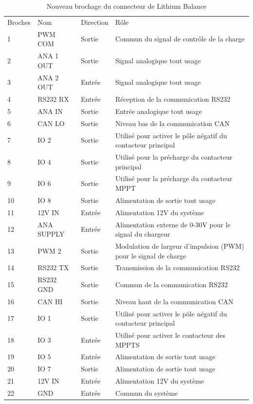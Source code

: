 		\begin{table}[H]
			\centering
			\caption{Nouveau brochage du connecteur de Lithium Balance}
			\label{22CBmsEclipse}	
			\renewcommand{\arraystretch}{1.3}
			\begin{tabular}{ | l | l | l | l | }
				\hline
				Broches & Nom & Direction & Rôle \\ \hhline{|=|=|=|=|}
				1 & PWM COM & Sortie & Commun du signal de contrôle de la charge \\ \hline
				2 & ANA 1 OUT & Sortie & Signal analogique tout usage \\ \hline
				3 & ANA 2 OUT & Entrée & Signal analogique tout usage \\ \hline
				4 & RS232 RX & Entrée & Réception de la communication RS232 \\ \hline
				5 & ANA IN & Sortie & Entrée analogique tout usage \\ \hline
				6 & CAN LO & Sortie & Niveau bas de la communication CAN \\ \hline
				7 & IO 2 & Sortie & Utilisé pour activer le pôle négatif du contacteur principal \\ \hline
				8 & IO 4 & Sortie & Utilisé pour la précharge du contacteur principal \\ \hline
				9 & IO 6 & Sortie & Utilisé pour la précharge du contacteur MPPT \\ \hline
				10 & IO 8 & Sortie & Alimentation de sortie tout usage \\ \hline
				11 & 12V IN & Entrée & Alimentation 12V du système \\ \hline
				12 & ANA SUPPLY & Entrée & Alimentation externe de 0-30V pour le signal du chargeur \\ \hline
				13 & PWM 2 & Sortie & Modulation de largeur d'impulsion (PWM) pour le signal de charge \\ \hline
				14 & RS232 TX & Sortie & Transmission de la communication RS232 \\ \hline
				15 & RS232 GND & Sortie & Commun de la communication RS232 \\ \hline
				16 & CAN HI & Sortie & Niveau haut de la communication CAN \\ \hline
				17 & IO 1  & Sortie & Utilisé pour activer le pôle négatif du contacteur principal \\ \hline
				18 & IO 3 & Entrée & Utilisé pour activer le contacteur des MPPTS \\ \hline
				19 & IO 5 & Entrée & Alimentation de sortie tout usage \\ \hline
				20 & IO 7 & Sortie & Alimentation de sortie tout usage \\ \hline
				21 & 12V IN & Entrée & Alimentation 12V du système \\ \hline
				22 & GND & Entrée & Commun du système \\ \hline
			\end{tabular}	
		\end{table}
